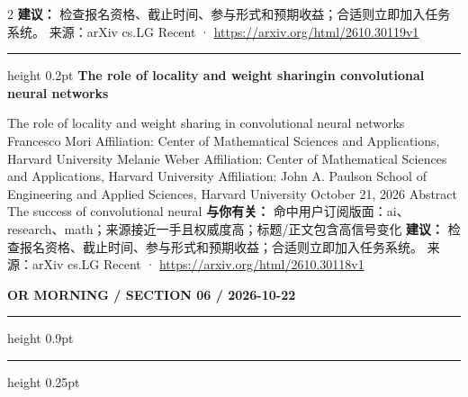 \documentclass[10.5pt]{ctexart}
\begin{document}
\begin{multicols}{2}
\textbf{建议：} 检查报名资格、截止时间、参与形式和预期收益；合适则立即加入任务系统。
{\footnotesize\color{ormuted} 来源：arXiv cs.LG Recent · \url{https://arxiv.org/html/2610.30119v1}}
\vspace{2mm}
\hrule height 0.2pt
\vspace{2mm}
{\large\bfseries The role of locality and weight sharingin convolutional neural networks}\par
The role of locality and weight sharing in convolutional neural networks Francesco Mori Affiliation: Center of Mathematical Sciences and Applications, Harvard University Melanie Weber Affiliation: Center of Mathematical Sciences and Applications, Harvard University Affiliation: John A. Paulson School of Engineering and Applied Sciences, Harvard University October 21, 2026 Abstract The success of convolutional neural 
\textbf{与你有关：} 命中用户订阅版面：ai、research、math；来源接近一手且权威度高；标题/正文包含高信号变化
\textbf{建议：} 检查报名资格、截止时间、参与形式和预期收益；合适则立即加入任务系统。
{\footnotesize\color{ormuted} 来源：arXiv cs.LG Recent · \url{https://arxiv.org/html/2610.30118v1}}
\end{multicols}
\newpage
{\small\bfseries OR MORNING / SECTION 06 / 2026-10-22}
\vspace{2mm}
\hrule height 0.9pt
\vspace{1.5mm}
\hrule height 0.25pt
\vspace{4mm}
\end{document}

